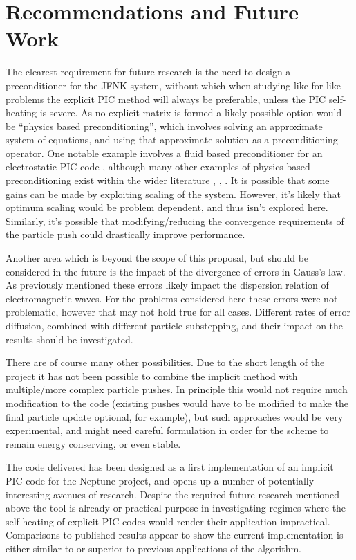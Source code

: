 \documentclass{article}
\begin{document}
\section{Recommendations and Future Work}

The clearest requirement for future research is the need to design a preconditioner for the JFNK system, without which when studying like-for-like problems the explicit PIC method will always be preferable, unless the PIC self-heating is severe. As no explicit matrix is formed a likely possible option would be ``physics based preconditioning'', which involves solving an approximate system of equations, and using that approximate solution as a preconditioning operator. One notable example involves a fluid based preconditioner for an electrostatic PIC code \cite{chacon_pic_pbp}, although many other examples of physics based preconditioning exist within the wider literature \cite{chacon20032d}, \cite{viallet2016jacobian}, \cite{park2009physics}. It is possible that some gains can be made by exploiting scaling of the system. However, it's likely that optimum scaling would be problem dependent, and thus isn't explored here. Similarly, it's possible that modifying/reducing the convergence requirements of the particle push could drastically improve performance.

Another area which is beyond the scope of this proposal, but should be considered in the future is the impact of the divergence of errors in Gauss's law. As previously mentioned these errors likely impact the dispersion relation of electromagnetic waves. For the problems considered here these errors were not problematic, however that may not hold true for all cases. Different rates of error diffusion, combined with different particle substepping, and their impact on the results should be investigated.

There are of course many other possibilities. Due to the short length of the project it has not been possible to combine the implicit method with multiple/more complex particle pushes. In principle this would not require much modification to the code (existing pushes would have to be modified to make the final particle update optional, for example), but such approaches would be very experimental, and might need careful formulation in order for the scheme to remain energy conserving, or even stable.

The code delivered has been designed as a first implementation of an implicit PIC code for the Neptune project, and opens up a number of potentially interesting avenues of research. Despite the required future research mentioned above the tool is already or practical purpose in investigating regimes where the self heating of explicit PIC codes would render their application impractical. Comparisons to published results appear to show the current implementation is either similar to or superior to previous applications of the algorithm.


\end{document}

